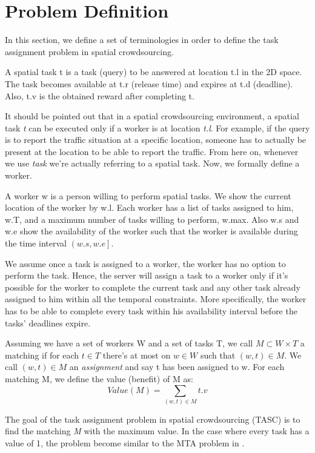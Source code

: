 \section{Problem Definition}

In this section, we define a set of terminologies in order to define the task assignment problem in spatial crowdsourcing.

\begin{definition} 
A spatial task t is a task (query) to be answered at location t.l in the 2D space. The task becomes available at t.r (release time) and expires at t.d (deadline). Also, t.v is the obtained reward after completing t.
\end{definition}

It should be pointed out that in a spatial crowdsourcing environment, a spatial task \emph{t} can be executed only if a worker is at location \emph{t.l}. For example, if the query is to report the traffic situation at a specific location, someone has to actually be present at the location to be able to report the traffic. From here on, whenever we use \emph{task} we're actually referring to a spatial task. Now, we formally define a worker.

\begin{definition} [Worker]
A worker w is a person willing to perform spatial tasks. We show the current location of the worker by w.l. Each worker has a list of tasks assigned to him, w.T, and a maximum number of tasks willing to perform, w.max. Also w.s and w.e show the availability of the worker such that the worker is available during the time interval $\left( w.s, w.e \right]$.
\end{definition}

We assume once a task is assigned to a worker, the worker has no option to perform the task. Hence, the server will assign a task to a worker only if it's possible for the worker to complete the current task and any other task already assigned to him within all the temporal constraints. More specifically, the worker has to be able to complete every task within his availability interval before the tasks' deadlines expire.

\begin{definition} [Matching]
Assuming we have a set of workers W and a set of tasks T, we call $M \subset W \times T$ a matching if for each $t \in T$ there's at most on $w \in W$ such that $\left( w, t \right) \in M$. We call $\left( w, t \right) \in M$ an \emph{assignment} and say t has been assigned to w. For each matching M, we define the value (benefit) of M as:
\begin{equation*}
Value(M) = \sum_{\left( w, t \right) \in M} t.v
\end{equation*}
\end{definition}

The goal of the task assignment problem in spatial crowdsourcing (TASC) is to find the matching \emph{M} with the maximum value. In the case where every task has a value of 1, the problem become similar to the MTA problem in \cite{kazemi12}.